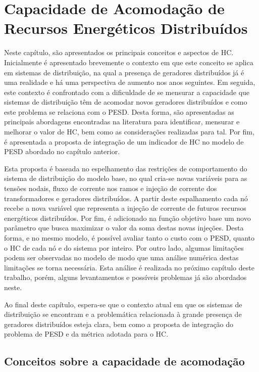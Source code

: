 \chapter{Capacidade de Acomodação de Recursos Energéticos Distribuídos}

Neste capítulo, são apresentados os principais conceitos e aspectos de \ac{HC}. Inicialmente é apresentado brevemente o contexto em que este conceito se aplica em sistemas de distribuição, na qual a presença de geradores distribuídos já é uma realidade e há uma perspectiva de aumento nos anos seguintes. Em seguida, este contexto é confrontado com a dificuldade de se mensurar a capacidade que sistemas de distribuição têm de acomodar novos geradores distribuídos e como este problema se relaciona com o \ac{PESD}. Desta forma, são apresentadas as principais abordagens encontradas na literatura para identificar, mensurar e melhorar o valor de \ac{HC}, bem como as considerações realizadas para tal. Por fim, é apresentada a proposta de integração de um indicador de \ac{HC} no modelo de \ac{PESD} abordado no capítulo anterior.

Esta proposta é baseada no espelhamento das restrições de comportamento do sistema de distribuição do modelo base, no qual cria-se novas variáveis para as tensões nodais, fluxo de corrente nos ramos e injeção de corrente dos transformadores e geradores distribuídos. A partir deste espalhamento cada nó recebe a nova variável que representa a injeção de corrente de futuros recursos energéticos distribuídos. Por fim, é adicionado na função objetivo base um novo parâmetro que busca maximizar o valor da soma destas novas injeções. Desta forma, e no mesmo modelo, é possível avaliar tanto o custo com o \ac{PESD}, quanto o \ac{HC} de cada nó e do sistema por inteiro. Por outro lado, algumas limitações podem ser observadas no modelo de modo que uma análise numérica destas limitações se torna necessária. Esta análise é realizada no próximo capítulo deste trabalho, porém, alguns levantamentos e possíveis problemas já são abordados neste. 

Ao final deste capítulo, espera-se que o contexto atual em que os sistemas de distribuição se encontram e a problemática relacionada à grande presença de geradores distribuídos esteja clara, bem como a proposta de integração do problema de \ac{PESD} e da métrica adotada para o \ac{HC}.


\section{Conceitos sobre a capacidade de acomodação}


